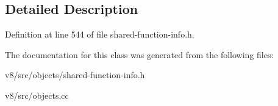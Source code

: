 \subsection{Detailed Description}


Definition at line 544 of file shared-\/function-\/info.\+h.



The documentation for this class was generated from the following files\+:\begin{DoxyCompactItemize}
\item 
v8/src/objects/shared-\/function-\/info.\+h\item 
v8/src/objects.\+cc\end{DoxyCompactItemize}
